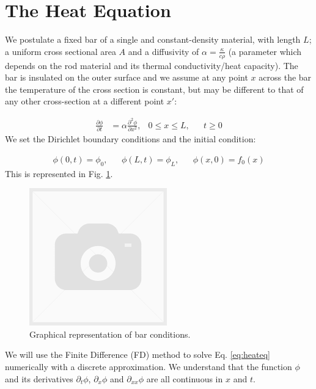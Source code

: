 \documentclass{article}[12pt]
\begin{document}
\section*{The Heat Equation}
We postulate a fixed bar of a single and constant-density material, with length $L$; a uniform cross sectional area $A$ and a diffusivity of $\alpha = \frac{\kappa}{c\rho}$ (a parameter which depends on the rod material and its thermal conductivity/heat capacity). The bar is insulated on the outer surface and we assume at any point $x$ across the bar the temperature of the cross section is constant, but may be different to that of any other cross-section at a different point $x'$:\par
\begin{align}\label{eq:heateq}
 \frac{\partial \phi}{\partial t} &= \alpha \frac{\partial^2\phi}{\partial x^2} , &  0\leq x \leq L, &&  t\geq 0
\end{align}
We set the Dirichlet boundary conditions and the initial condition:\par
\begin{align}
  \phi(0,t) = \phi_0, & & \phi(L,t) = \phi_L, & & \phi(x,0) = f_0(x)
\end{align}
This is represented in Fig. \ref{fig:bar_representation}.\par
\begin{figure}[h]
  \centering
  \includegraphics[scale = 0.5]{bar_representation.png}
  \caption{Graphical representation of bar conditions.}
  \label{fig:bar_representation}
\end{figure}
We will use the Finite Difference (FD) method to solve Eq. \eqref{eq:heateq} numerically with a discrete approximation. We understand that the function $\phi$ and its derivatives $\partial_t\phi$, $\partial_x\phi$ and $\partial_{xx}\phi$ are all continuous in $x$ and $t$.
\end{document}
